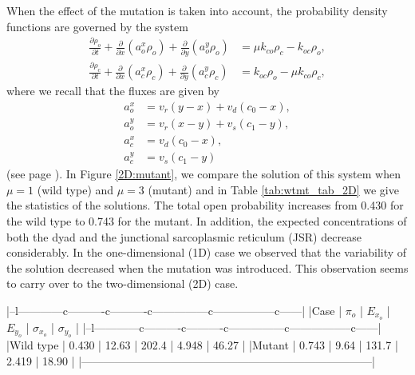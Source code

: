 {When the effect of the mutation is taken into account, the probability density functions are governed by the system 
\begin{align}
\frac{\partial\rho_{o}}{\partial t}+\frac{\partial}{\partial x}\left(
a_{o}^{x}\rho_{o}\right)  +\frac{\partial}{\partial y}\left(  a_{o}^{y}
\rho_{o}\right)   &  =\mu k_{co}\rho_{c}-k_{oc}\rho_{o},\label{eq:pdf211}\\
\frac{\partial\rho_{c}}{\partial t}+\frac{\partial}{\partial x}\left(
a_{c}^{x}\rho_{c}\right)  +\frac{\partial}{\partial y}\left(  a_{c}^{y}
\rho_{c}\right)   &  =k_{oc}\rho_{o}-\mu k_{co}\rho_{c},\label{eq:pdf212}
\end{align}
where we recall that the fluxes are given by
\begin{align}
a_{o}^{x} &  =v_{r}\left(  y-x\right)  +v_{d}\left(  c_{0}-x\right)
,\nonumber\\
a_{o}^{y} &  =v_{r}\left(  x-y\right)  +v_{s}\left(  c_{1}-y\right)
,\label{eq:fluxes2D}\\
a_{c}^{x} &  =v_{d}\left(  c_{0}-x\right)  ,\nonumber\\
a_{c}^{y} &  =v_{s}\left(  c_{1}-y\right) \nonumber
\end{align}
(see page \pageref{eq:pdf21}).
In Figure \ref{2D:mutant}, we compare the solution of this system when $\mu=1$ (wild type)
and $\mu=3$ (mutant) and in Table \ref{tab:wtmt_tab_2D} we give the statistics of the solutions. The total 
open probability increases from 0.430 for the wild type to 0.743 for the mutant. In addition, the expected concentrations
of both the dyad and the junctional sarcoplasmic reticulum (JSR) decrease considerably. In the one-dimensional (1D) case we observed that the variability of the solution decreased when the mutation was introduced. This observation seems to carry over to the two-dimensional (2D) case.



|--l------------c----------c----------c---------------c-----------------c------|
|Case      | $\pi_o$ | $E_{x_o}$ | $E_{y_o}$ | $\sigma_{x_o}$ | $\sigma_{y_o}$ |
|--l------------c----------c----------c---------------c-----------------c------|
|Wild type | 0.430   | 12.63     | 202.4     | 4.948          | 46.27          |
|Mutant    | 0.743   | 9.64      | 131.7     | 2.419          | 18.90          |
|------------------------------------------------------------------------------| 

}
